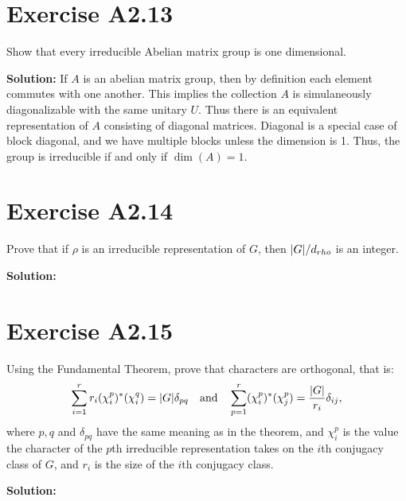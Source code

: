 \documentclass{book}
\begin{document}
\section*{Exercise A2.13}
    Show that every irreducible Abelian matrix group is one dimensional.
    
    \textbf{Solution:} If $A$ is an abelian matrix group, then by definition each element commutes with one another. This implies the collection $A$ is simulaneously diagonalizable with the same unitary $U$. Thus there is an equivalent representation of $A$ consisting of diagonal matrices. Diagonal is a special case of block diagonal, and we have multiple blocks unless the dimension is 1. Thus, the group is irreducible if and only if $\dim(A) = 1$.

\section*{Exercise A2.14}
    Prove that if $\rho$ is an irreducible representation of $G$, then $\abs{G}/d_{rho}$ is an integer.
    
    \textbf{Solution:}

\section*{Exercise A2.15}
    Using the Fundamental Theorem, prove that characters are orthogonal, that is:
    \begin{align}
        \sum_{i=1}^r r_i(\chi_i^p)^*(\chi_i^q) = \abs{G}\delta_{pq} \quad \text{and} \quad \sum_{p=1}^r (\chi_i^p)^*(\chi_j^p) = \frac{\abs{G}}{r_i} \delta_{ij},
    \end{align}
    where $p, q$ and $\delta_{pq}$ have the same meaning as in the theorem, and $\chi_i^p$ is the value the character of the $p$th irreducible representation takes on the $i$th conjugacy class of $G$, and $r_i$ is the size of the $i$th conjugacy class.
    
    \textbf{Solution:}
\end{document}
